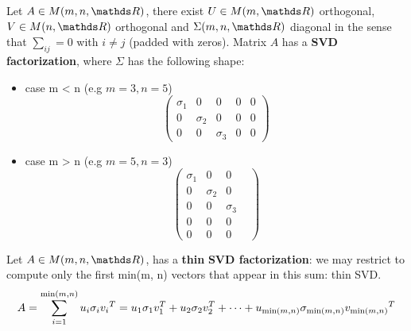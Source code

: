 \documentclass[computationalMathematics.tex]{subfiles}
\begin{document}
\begin{definition}
  Let $A \in M(m, n, \R)$, there exist $U \in M(m, \R)$ orthogonal, $V \in M(n, \R)$ orthogonal and $\Sigma(m, n, \R)$ diagonal in the sense that $\sum_{ij} = 0$ with $i \neq j$ (padded with zeros). Matrix $A$  has a \textbf{SVD factorization}, where $\Sigma$ has the following shape:
  \begin{itemize}
      \item case m < n  (e.g $m=3, n=5$)
        \[
          \begin{pmatrix}
            \sigma_1&0&0&0&0\\
            0& \sigma_2&0&0&0\\
            0&0&\sigma_3&0&0
          \end{pmatrix}
        \]
        
        \item  case m > n (e.g $m=5, n=3$)
        \[
          \begin{pmatrix}
            \sigma_1&0&0&\\
            0& \sigma_2&0&\\
            0&0&\sigma_3&\\
            0&0&0\\
            0&0&0
          \end{pmatrix}
        \]
  \end{itemize}

\end{definition}

\begin{definition}
  Let $A \in M(m, n, \R)$,   has a \textbf{thin} \textbf{SVD factorization}:  we may restrict to compute only the first min(m, n)
vectors that appear in this sum: thin SVD.
  \[
    A = \sum\limits_{i=1}^{\min(m, n)} u_i \sigma_i {v_i}^{T} = u_1 \sigma_1 v_1^T + u_2 \sigma_2 v_2^T + \cdots + u_{\min(m,n)} \sigma_{\min(m,n)} {v_{\min(m,n)}}^{T}
  \]
\end{definition}

\end{document}
